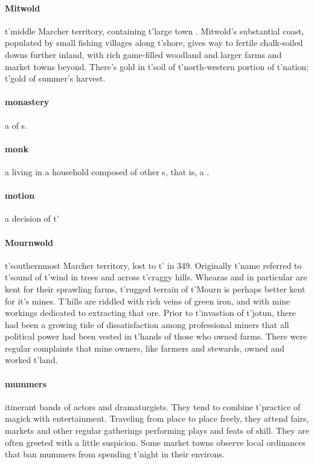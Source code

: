 \paragraph{Mitwold} t'\allowbreak middle Marcher territory, containing t'\allowbreak large town . Mitwold's substantial  coast, populated by small fishing villages along t'\allowbreak shore, gives way to fertile chalk-soiled downs further inland, with rich game-filled woodland and larger farms and market towns beyond. There's gold in t'\allowbreak soil of t'\allowbreak north-western portion of t'\allowbreak nation; t'\allowbreak gold of summer's harvest.
\paragraph{monastery} a  of s.
\paragraph{monk} a  living in a household composed of other s, that is, a .
\paragraph{motion} a decision of t'\allowbreak {}
\paragraph{Mournwold} t'\allowbreak southernmost Marcher territory, lost to t'\allowbreak {} in 349. Originally t'\allowbreak name referred to t'\allowbreak sound of t'\allowbreak wind in trees and across t'\allowbreak craggy hills. Whearas  and  in particular are kent for their sprawling farms, t'\allowbreak rugged terrain of t'\allowbreak Mourn is perhaps better kent for it's mines. T'hills are riddled with rich veins of green iron, and with mine workings dedicated to extracting that ore. Prior to t'\allowbreak invastion of t'\allowbreak jotun, there had been a growing tide of dissatisfaction among professional miners that all political power had been vested in t'\allowbreak hands of those who owned farms. There were regular complaints that mine owners, like farmers and stewards, owned and worked t'\allowbreak land.
\paragraph{mummers} itinerant bands of actors and dramaturgists. They tend to combine t'\allowbreak practice of  magick with entertainment. Traveling from place to place freely, they attend fairs, markets and other regular gatherings performing plays and feats of skill. They are often greeted with a little suspicion. Some market towns observe local ordinances that ban mummers from spending t'\allowbreak night in their environs.
